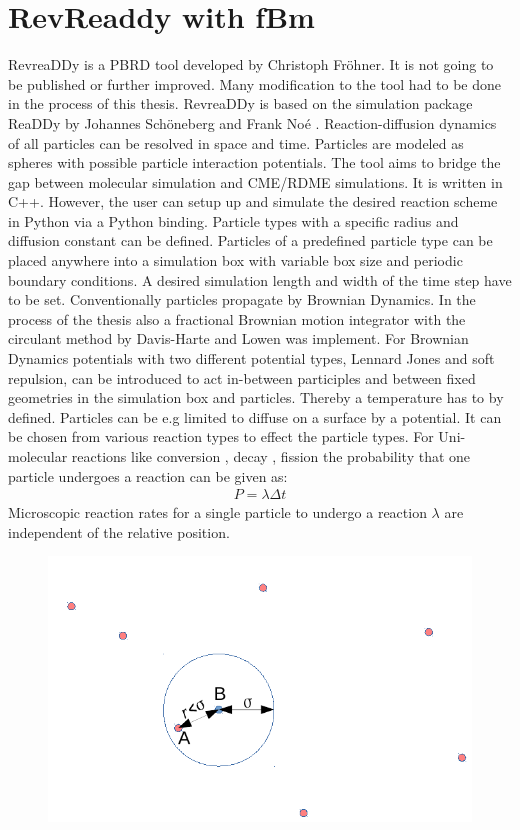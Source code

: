 \documentclass[
  a4paper,BCOR10mm,oneside,
  headsepline,footsepline,%
  fleqn,openbib
]{scrbook}
\begin{document}
\section{RevReaddy with fBm} 
RevreaDDy is a PBRD tool developed by Christoph Fröhner. It is not going to be published or further improved. Many modification to the tool had to be done in the process of this thesis. RevreaDDy is based on the simulation package ReaDDy by Johannes Schöneberg and Frank Noé \cite{10.1371/journal.pone.0074261}. Reaction-diffusion dynamics of all particles can be resolved in space and time. Particles are modeled as spheres with possible particle interaction potentials. The tool aims to bridge the gap between molecular simulation and CME/RDME simulations. It is written in C++. However, the user can setup up and simulate the desired reaction scheme in Python via a Python binding. Particle types with a specific radius and diffusion constant can be defined. Particles of a predefined particle type can be placed anywhere into a simulation box with variable box size and periodic boundary conditions. A desired simulation length and width of the time step have to be set. Conventionally particles propagate by Brownian Dynamics. In the process of the thesis also a fractional Brownian motion integrator with the circulant method by Davis-Harte \cite{Dieker2004}  and Lowen \cite{Lowen1999} was implement. For Brownian Dynamics potentials with two different potential types, Lennard Jones and soft repulsion, can be introduced to act in-between participles and between fixed geometries  in the simulation box and particles. Thereby a temperature has to by defined. Particles can be e.g limited to diffuse on a surface by a potential. It can be chosen from various reaction types to effect the particle types. For Uni-molecular reactions like conversion , decay , fission  the probability that one particle undergoes a reaction can be given as:
\begin{align} \label{propabilityreaction}
 P=\lambda \Delta t
\end{align}
Microscopic reaction rates for a single particle to undergo a reaction $\lambda$ are independent of the relative position.
\begin{figure} 
  \centering
  \includegraphics[width=0.7 \textwidth]{./data/schemeforreacions1.png}
  \captionsetup{width=\linewidth}
  \label{fig:model-reactions}
\end{figure}
\end{document}
